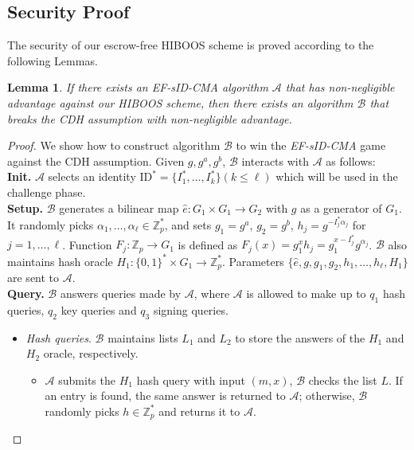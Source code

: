 \documentclass[times]{secauth}
\newtheorem{lemma}[theorem]{Lemma}
\theoremstyle{definition}
\theoremstyle{remark}
\begin{document}
\subsection{Security Proof}
The security of our escrow-free HIBOOS scheme is proved according to the following Lemmas. 
\begin{lemma} \label{lemma-ef-hiboos}
If there exists an EF-sID-CMA algorithm $\mathcal{A}$ that has non-negligible advantage against our HIBOOS scheme, 
then there exists an algorithm $\mathcal{B}$ that breaks the CDH assumption with non-negligible advantage.
\end{lemma}
\begin{proof}
We show how to construct algorithm $\mathcal{B}$ to win the \emph{EF-sID-CMA} game against the CDH assumption. 
Given $g, g^a, g^b$, $\mathcal{B}$ interacts with $\mathcal{A}$ as follows:
\vspace{0.1cm}
\\
\textbf{Init.} 
$\mathcal{A}$ selects an identity $\mathrm{ID}^* = \{I^*_1, \ldots, I^*_k\} (k \leqslant \ell)$ which will be used in the challenge phase.  
\vspace{0.1cm}
\\
\textbf{Setup.} 
$\mathcal{B}$ generates a bilinear map $\hat{e}: G_1 \times G_1 \rightarrow G_2$ with $g$ as a generator of $G_1$.
It randomly picks $\alpha_1, \ldots, \alpha_\ell \in \mathbb{Z}^*_p$, and sets $g_1 = g^a$, $g_2 = g^b$, $h_j =g^{-I^*_j\alpha_j}$ for $j = 1, \ldots, \ell$.
Function $F_j : \mathbb{Z}_p \rightarrow G_1$ is defined as $F_j(x)=g_1^xh_j =g_1^{x-I^*_j}g^{\alpha_j}$.
$\mathcal{B}$ also maintains hash oracle $H_1: \{0, 1\}^* \times G_1 \rightarrow \mathbb{Z}_p^*$.
Parameters $\{\hat{e}, g, g_1,  g_2, h_1, \ldots, h_\ell, H_1\}$ are sent to $\mathcal{A}$.
\vspace{0.1cm}
\\
\textbf{Query.} $\mathcal{B}$ answers queries made by $\mathcal{A}$, where $\mathcal{A}$ is allowed to make up to $q_1$ hash queries, $q_2$ key queries and $q_3$ signing queries.
\begin{itemize}
	\item \emph{Hash queries}. 
	$\mathcal{B}$ maintains lists $L_1$ and $L_2$ to store the answers of the $H_1$ and $H_2$ oracle, respectively.
	\begin{itemize}
	\item $\mathcal{A}$ submits the $H_1$ hash query with input $(m, x)$, $\mathcal{B}$ checks the list $L$. 
	If an entry is found, the same answer is returned to $\mathcal{A}$; otherwise, $\mathcal{B}$ randomly picks $h \in \mathbb{Z}_p^*$ and returns it to $\mathcal{A}$.

\end{itemize}
\end{itemize}
\end{proof}
\end{document}
